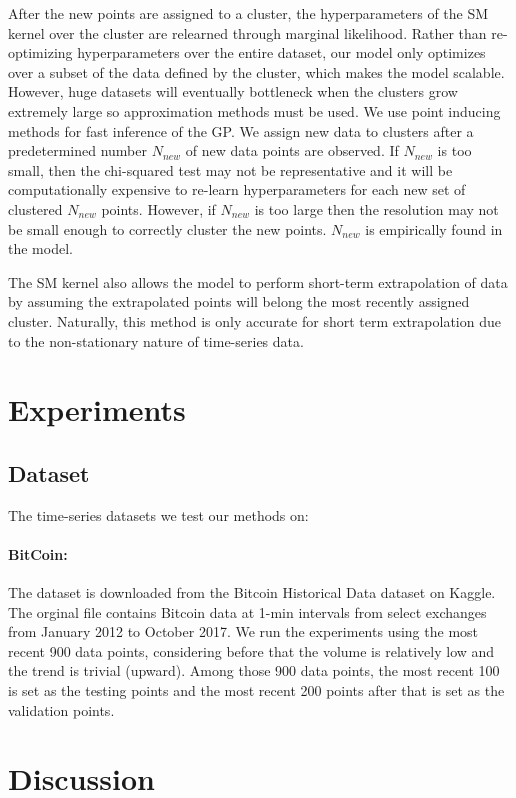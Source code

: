 \documentclass{article}
\begin{document}
After the new points are assigned to a cluster, the hyperparameters of the SM kernel over the cluster are relearned through marginal likelihood. Rather than re-optimizing hyperparameters over the entire dataset, our model only optimizes over a subset of the data defined by the cluster, which makes the model scalable. However, huge datasets will eventually bottleneck when the clusters grow extremely large so approximation methods must be used. We use point inducing methods for fast inference of the GP. We assign new data to clusters after a predetermined number $N_{new}$ of new data points are observed. If $N_{new}$ is too small, then the chi-squared test may not be representative and it will be computationally expensive to re-learn hyperparameters for each new set of clustered $N_{new}$ points. However, if $N_{new}$ is too large then the resolution may not be small enough to correctly cluster the new points. $N_{new}$ is empirically found in the model.

The SM kernel also allows the model to perform short-term extrapolation of data by assuming the extrapolated points will belong the most recently assigned cluster. Naturally, this method is only accurate for short term extrapolation due to the non-stationary nature of time-series data.

\section{Experiments}

\subsection{Dataset}
The time-series datasets we test our methods on:
\paragraph{BitCoin:} The dataset is downloaded from the Bitcoin Historical Data dataset on Kaggle. The orginal file contains Bitcoin data at 1-min intervals from select exchanges from January 2012 to October 2017. We run the experiments using the most recent 900 data points, considering before that the volume is relatively low and the trend is trivial (upward). Among those 900 data points, the most recent 100 is set as the testing points and the most recent 200 points after that is set as the validation points. 

\section{Discussion}



\end{document}
